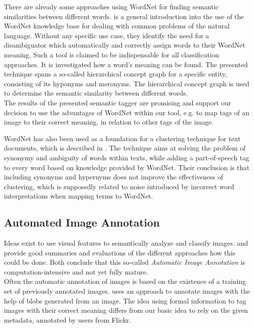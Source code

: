\bigskip
There are already some approaches using WordNet for finding semantic similarities between different words.  \cite{richardson1994using} is a general introduction into the use of the WordNet knowledge base for dealing with common problems of the natural language. Without any specific use case, they identify the need for a disambiguator which automatically and correctly assign words to their WordNet meaning. Such a tool is claimed to be indispensable for all classification approaches. It is investigated how a word's meaning can be found. The presented technique spans a so-called hierarchical concept graph for a specific entity, consisting of its hyponyms  and meronyms. The hierarchical concept graph is used to determine the semantic similarity between different words. \\
The results of the presented semantic tagger are promising and support our decision to use the advantages of WordNet within our tool, e.g. to map tags of an image to their correct meaning, in relation to other tags of the image.

\bigskip
WordNet has also been used as a foundation for a clustering technique for text documents, which is described in \cite{sedding2004wordnet}. The technique aims at solving the problem of synonymy and ambiguity of words within texts, while adding a part-of-speech tag to every word based on knowledge provided by WordNet. Their conclusion is that including synonyms and hypernyms does not improve the effectiveness of clustering, which is supposedly related to noise introduced by incorrect word interpretations when mapping terms to WordNet.

\subsection{Automated Image Annotation}

Ideas exist to use visual features to semantically analyze and classify images. \cite{Liu2007} and \cite{Zhang2012} provide good summaries and evaluations of the different approaches how this could be done. Both conclude that this so-called \emph{Automatic Image Annotation}  is computation-intensive and not yet fully mature. \\
Often the automatic annotation of images is based on the existence of a training set of previously annotated images.  \cite{jeon2003automatic}	uses an approach to annotate images with the help of blobs generated from an image. The idea using formal information to tag images with their correct meaning differs from our basic idea to rely on the given metadata, annotated by users from Flickr.

